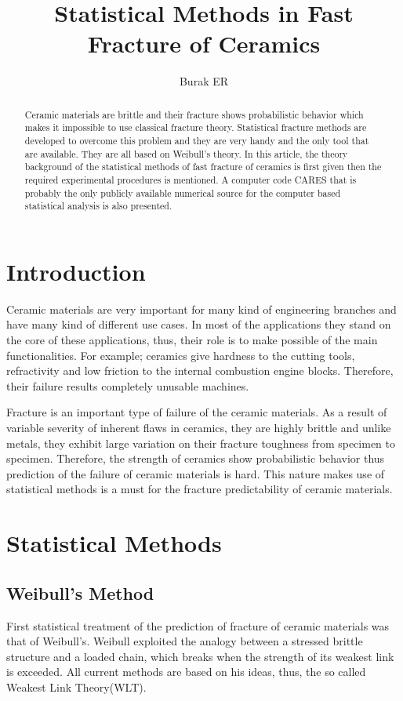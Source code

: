 \documentclass[]{article}
\title{Statistical Methods in Fast Fracture of Ceramics}
\author{Burak ER}
\begin{document}
\maketitle

\begin{abstract}
Ceramic materials are brittle and their fracture shows probabilistic behavior which makes it impossible to use classical fracture theory. Statistical fracture methods are developed to overcome this problem and they are very handy and the only tool that are available. They are all based on Weibull's theory. In this article, the theory background of the statistical methods of fast fracture of ceramics is first given then the required experimental procedures is mentioned. A computer code CARES that is probably the only publicly available numerical source for the computer based statistical analysis is also presented.
\end{abstract}

\section{Introduction}
Ceramic materials are very important for many kind of engineering branches and have many kind of different 
use cases. In most of the applications they stand on the core of these applications, thus, their role is to make possible of the main 
functionalities. For example; ceramics give hardness to the cutting tools, 
refractivity and low friction to the internal combustion engine blocks. Therefore, their failure results completely unusable machines. 

Fracture is an important type of failure of the ceramic materials. As a result of variable severity of inherent flaws in ceramics, 
they are highly brittle and unlike metals, they exhibit large variation on their fracture toughness from specimen to specimen. Therefore, 
the strength of ceramics show probabilistic behavior thus prediction of the failure of ceramic materials is hard. 
This nature makes use of statistical methods is a must for the fracture predictability of ceramic materials.

\section{Statistical Methods}  
\subsection*{Weibull's Method}
First statistical treatment of the prediction of fracture of ceramic materials was that of Weibull's\cite{weibull1939}. Weibull exploited the analogy between a stressed brittle structure and a loaded chain, which breaks when the strength of its weakest link is exceeded. All current methods are based on his ideas, thus, the so called Weakest Link Theory(WLT).
\end{document}
